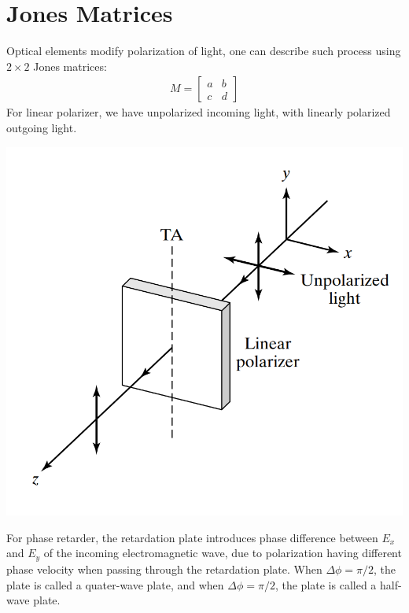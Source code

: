 \documentclass[11pt]{book}
\theoremstyle{break}
\theoremstyle{break}
\newcommand{\bmat}[1]{\begin{bmatrix} #1 \end{bmatrix}}
\begin{document}
\section[Jones Matrices]{\color{red}Jones Matrices\color{black}}
Optical elements modify polarization of light, one can describe such process using $2\times 2$ Jones matrices:
\begin{align*}
M = \bmat{a & b \\ c& d}
\end{align*}
For linear polarizer, we have unpolarized incoming light, with linearly polarized outgoing light.\\
\begin{center}
\includegraphics[scale=0.35]{linearPol}
\end{center}
For phase retarder, the retardation plate introduces phase difference between $E_x$ and $E_y$ of the incoming electromagnetic wave, due to polarization having different phase velocity when passing through the retardation plate. When $\Delta \phi = \pi/2$, the plate is called a quater-wave plate, and when $\Delta \phi = \pi/2$, the plate is called a half-wave plate. 
\end{document}
